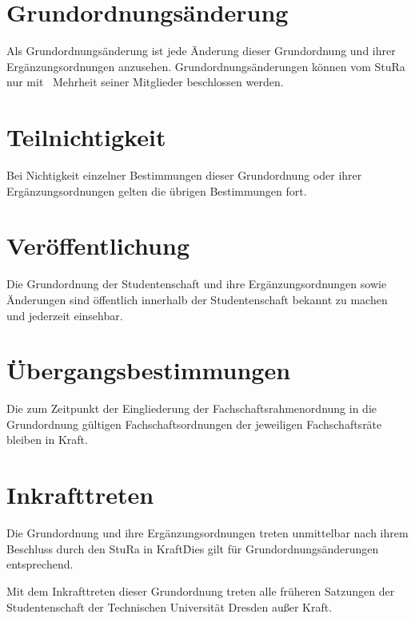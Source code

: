 \begin{multicols}{2}
\section{Grundordnungsänderung}

\Abs \Satz Als Grundordnungsänderung ist jede Änderung dieser Grundordnung und ihrer Ergänzungsordnungen anzusehen. Grundordnungsänderungen können vom StuRa nur mit ~Mehrheit seiner Mitglieder beschlossen werden.



\section{Teilnichtigkeit}

\Abs \Satz Bei Nichtigkeit einzelner Bestimmungen dieser Grundordnung oder ihrer Ergänzungsordnungen gelten die übrigen Bestimmungen fort.



\section{Veröffentlichung}

\Abs \Satz Die Grundordnung der Studentenschaft und ihre Ergänzungsordnungen sowie Änderungen sind öffentlich innerhalb der Studentenschaft bekannt zu machen und jederzeit einsehbar.



\section{Übergangsbestimmungen}

\Abs \Satz Die zum Zeitpunkt der Eingliederung der Fachschaftsrahmenordnung in die Grundordnung gültigen Fachschaftsordnungen der jeweiligen Fachschaftsräte bleiben in Kraft.



\section{Inkrafttreten}

\Abs \Satz Die Grundordnung und ihre Ergänzungsordnungen treten unmittelbar nach ihrem Beschluss durch den StuRa in Kraft\. Dies gilt für Grundordnungsänderungen entsprechend.

\Abs \Satz Mit dem Inkrafttreten dieser Grundordnung treten alle früheren Satzungen der Studentenschaft der Technischen Universität Dresden außer Kraft.

\end{multicols}

